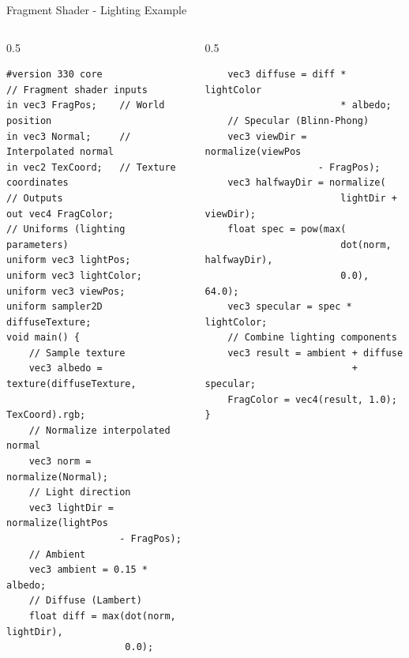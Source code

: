 \begin{frame}[fragile]{Fragment Shader - Lighting Example}
  \begin{columns}
    \begin{column}{0.5\textwidth}
      \begin{verbatim}
#version 330 core
// Fragment shader inputs
in vec3 FragPos;    // World position
in vec3 Normal;     // Interpolated normal
in vec2 TexCoord;   // Texture coordinates
// Outputs
out vec4 FragColor;
// Uniforms (lighting parameters)
uniform vec3 lightPos;
uniform vec3 lightColor;
uniform vec3 viewPos;
uniform sampler2D diffuseTexture;
void main() {
    // Sample texture
    vec3 albedo = texture(diffuseTexture,
                         TexCoord).rgb;
    // Normalize interpolated normal
    vec3 norm = normalize(Normal);
    // Light direction
    vec3 lightDir = normalize(lightPos
                    - FragPos);
    // Ambient
    vec3 ambient = 0.15 * albedo;
    // Diffuse (Lambert)
    float diff = max(dot(norm, lightDir),
                     0.0);
      \end{verbatim}
    \end{column}
    \begin{column}{0.5\textwidth}
         \begin{verbatim}
    vec3 diffuse = diff * lightColor
                        * albedo;
    // Specular (Blinn-Phong)
    vec3 viewDir = normalize(viewPos
                    - FragPos);
    vec3 halfwayDir = normalize(
                        lightDir + viewDir);
    float spec = pow(max(
                        dot(norm, halfwayDir),
                        0.0), 64.0);
    vec3 specular = spec * lightColor;
    // Combine lighting components
    vec3 result = ambient + diffuse
                          + specular;
    FragColor = vec4(result, 1.0);
}
      \end{verbatim}
      \vspace{3cm}
    \end{column}
  \end{columns}
\end{frame}


